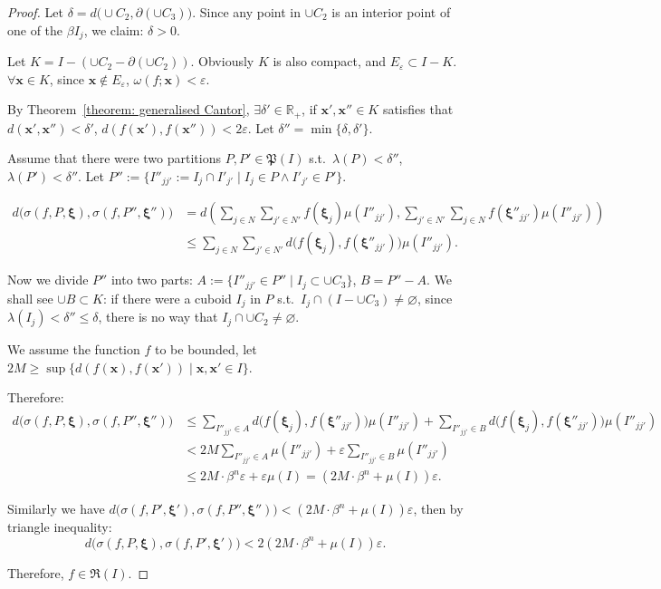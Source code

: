 \documentclass[openany]{book}
\theoremstyle{plain}
\theoremstyle{definition}
\newcommand*{\bv}{\boldsymbol} %
\begin{document}
\begin{proof}
	Let $\delta = d\big(\cup C_2, \partial (\cup C_3)\big)$. 
	Since any point in $\cup C_2$ is an interior point of one of the $\beta I_j$, we claim: $\delta > 0$.

	Let $K = I - (\cup C_2 - \partial (\cup C_2))$. Obviously $K$ is also compact, and $E_\varepsilon \subset I - K$. $\forall \bv x \in K$, since $\bv x \notin E_\varepsilon$, $\omega(f; \bv x) < \varepsilon$.

	By Theorem~\ref{theorem: generalised Cantor}, $\exists \delta' \in \mathbb R_+$, if $\bv x', \bv x'' \in K$ satisfies that $d(\bv x', \bv x'') < \delta'$, $d(f(\bv x'), f(\bv x'')) < 2\varepsilon$. 
	Let $\delta'' = \min\{\delta, \delta'\}$.

	Assume that there were two partitions $P, P' \in \mathfrak P(I)$ s.t.\ $\lambda(P) < \delta''$, $\lambda(P') < \delta''$. Let $P'' := \{I''_{jj'} := I_j \cap I'_{j'} \mid I_j \in P \wedge I'_{j'} \in P'\}$.

	\begin{align*}
		d\big(\sigma(f, P, \bv \xi), \sigma(f, P'', \bv \xi'')\big)
			&= d\left( 
				\sum_{j \in N} \sum_{j' \in N'} f(\bv \xi_j) \mu(I''_{jj'}), \sum_{j' \in N'}\sum_{j \in N} f(\bv \xi''_{jj'}) \mu(I''_{jj'})
			 \right)
		\\
		&\leq \sum_{j \in N} \sum_{j' \in N'} d\big(f(\bv \xi_j), f(\bv \xi''_{jj'})\big) 
			\mu(I''_{jj'}).
	\end{align*}

	Now we divide $P''$ into two parts: $A := \{I''_{jj'} \in P'' \mid I_j \subset \cup C_3\}$, $B = P'' - A$. 
	We shall see $\cup B \subset K$: if there were a cuboid $I_j$ in $P$ s.t.\ $I_j \cap (I - \cup C_3) \neq \varnothing$, since $\lambda(I_j) < \delta'' \leq \delta$, there is no way that $I_j \cap \cup C_2 \neq \varnothing$.

	We assume the function $f$ to be bounded, let $2M \geq \sup \{d(f(\bv x), f(\bv x')) \mid \bv x, \bv x' \in I\}$.

	Therefore:
	\begin{align*}
		d\big(\sigma(f, P, \bv \xi), \sigma(f, P'', \bv \xi'')\big)
		&\leq \sum_{I''_{jj'} \in A} d\big(f(\bv \xi_j), f(\bv \xi''_{jj'})\big) \mu(I''_{jj'})
			+ \sum_{I''_{jj'} \in B} d\big(f(\bv \xi_j), f(\bv \xi''_{jj'})\big) \mu(I''_{jj'})
		\\
		&<  2 M \sum_{I''_{jj'} \in A} \mu(I''_{jj'}) + \varepsilon \sum_{I''_{jj'} \in B} \mu(I''_{jj'})
		\\
		&\leq 2M \cdot \beta^n \varepsilon + \varepsilon \mu(I)
		=  ( 2M \cdot \beta^n + \mu(I)) \varepsilon.
	\end{align*}

	Similarly we have $d\big(\sigma(f, P', \bv \xi'), \sigma(f, P'', \bv \xi'')\big) < ( 2M \cdot \beta^n + \mu(I)) \varepsilon$, then by triangle inequality:
	\begin{equation*}
		d\big(\sigma(f, P, \bv \xi), \sigma(f, P', \bv \xi')\big) < 2( 2M \cdot \beta^n + \mu(I)) \varepsilon.
	\end{equation*}

	Therefore, $f \in \mathfrak R(I)$.
\end{proof}
\end{document}
